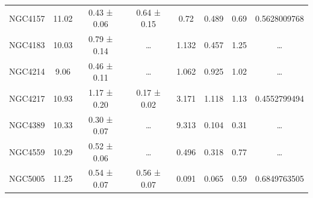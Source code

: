 \documentclass[reprint,%
 amsmath,amssymb,
 aps,
]{revtex4-1}
\begin{document}
\begin{table}[]
\begin{tabular}{cccccrrc}
\rowcolor[HTML]{F3F3F3} 
NGC4157              & 11.02                     & 0.43 ± 0.06           & 0.64 ± 0.15            & 0.72                                                         & 0.489                                                         & 0.69                                                         & \multicolumn{1}{r}{\cellcolor[HTML]{F3F3F3}0.5628009768}      \\
\rowcolor[HTML]{F3F3F3} 
NGC4183              & 10.03                     & 0.79 ± 0.14           & …                      & 1.132                                                        & 0.457                                                        & 1.25                                                           & …                                                             \\
\rowcolor[HTML]{F3F3F3} 
NGC4214              & 9.06                      & 0.46 ± 0.11           & …                      & 1.062                                                        & 0.925                                                           & 1.02                                                          & …                                                             \\
\rowcolor[HTML]{F3F3F3} 
NGC4217              & 10.93                     & 1.17 ± 0.20           & 0.17 ± 0.02            & 3.171                                                        & 1.118                                                           & 1.13                                                           & \multicolumn{1}{r}{\cellcolor[HTML]{F3F3F3}0.4552799494}      \\
\rowcolor[HTML]{F3F3F3} 
NGC4389              & 10.33                     & 0.30 ± 0.07           & …                      & 9.313                                                        & 0.104                                                          & 0.31                                                          & …                                                             \\
\rowcolor[HTML]{F3F3F3} 
NGC4559              & 10.29                     & 0.52 ± 0.06           & …                      & 0.496                                                        & 0.318                                                          & 0.77                                                           & …                                                             \\
\rowcolor[HTML]{F3F3F3} 
NGC5005              & 11.25                     & 0.54 ± 0.07           & 0.56 ± 0.07            & 0.091                                                        & 0.065                                                         & 0.59                                                           & \multicolumn{1}{r}{\cellcolor[HTML]{F3F3F3}0.6849763505}      \\

\end{tabular}
\end{table}
\end{document}

